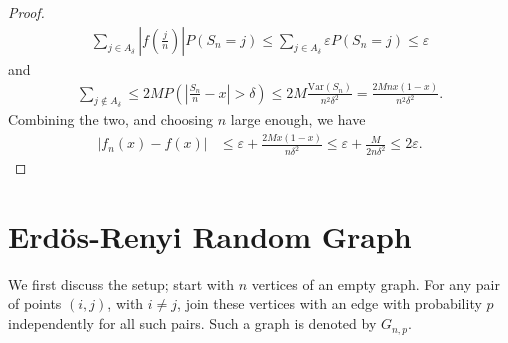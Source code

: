 \documentclass[15pt,a4paper]{book}
\theoremstyle{definition}
\newcommand{\abs}[1]{\left| #1 \right|} %
\begin{document}
\begin{proof}
\begin{align}
        \sum_{j \in A_{\delta}} \abs{f(\frac{j}{n})} P(S_{n}=j) \leq \sum_{j \in A_{\delta}} \varepsilon P(S_{n} = j) \leq \varepsilon
    \end{align}
    and
    \begin{align}
        \sum_{j \notin A_{\delta}} \leq 2M P(\abs{\frac{S_{n}}{n}-x} > \delta) \leq 2M \frac{\text{Var}(S_{n})}{n^{2}\delta^{2}} = \frac{2Mnx(1-x)}{n^{2}\delta^{2}}.
    \end{align}
    Combining the two, and choosing $n$ large enough, we have
    \begin{align}
        \abs{f_{n}(x)-f(x)} &\leq \varepsilon + \frac{2Mx(1-x)}{n\delta^{2}} \leq \varepsilon + \frac{M}{2n\delta^{2}} \leq 2\varepsilon.
    \end{align}
\end{proof}

\section{Erd\"os-Renyi Random Graph}
We first discuss the setup; start with $n$ vertices of an empty graph. For any pair of points $(i,j)$, with $i \neq j$, join these vertices with an edge with probability $p$ independently for all such pairs. Such a graph is denoted by $G_{n,p}$.
\end{document}
